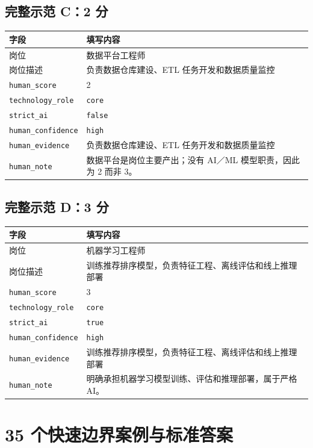 \documentclass[11pt,a4paper,fontset=none]{ctexart}
\newcommand{\field}[1]{\nolinkurl{#1}}
\begin{document}
\subsection{完整示范 C：2 分}

\noindent\begin{tabularx}{\textwidth}{L{3.2cm}Y}
\toprule
字段 & 填写内容\\
\midrule
岗位 & 数据平台工程师\\
岗位描述 & 负责数据仓库建设、ETL 任务开发和数据质量监控\\
\field{human_score} & 2\\
\field{technology_role} & \texttt{core}\\
\field{strict_ai} & \texttt{false}\\
\field{human_confidence} & \texttt{high}\\
\field{human_evidence} & 负责数据仓库建设、ETL 任务开发和数据质量监控\\
\field{human_note} & 数据平台是岗位主要产出；没有 AI／ML 模型职责，因此为 2 而非 3。\\
\bottomrule
\end{tabularx}

\subsection{完整示范 D：3 分}

\noindent\begin{tabularx}{\textwidth}{L{3.2cm}Y}
\toprule
字段 & 填写内容\\
\midrule
岗位 & 机器学习工程师\\
岗位描述 & 训练推荐排序模型，负责特征工程、离线评估和线上推理部署\\
\field{human_score} & 3\\
\field{technology_role} & \texttt{core}\\
\field{strict_ai} & \texttt{true}\\
\field{human_confidence} & \texttt{high}\\
\field{human_evidence} & 训练推荐排序模型，负责特征工程、离线评估和线上推理部署\\
\field{human_note} & 明确承担机器学习模型训练、评估和推理部署，属于严格 AI。\\
\bottomrule
\end{tabularx}

\section{35 个快速边界案例与标准答案}
\end{document}
